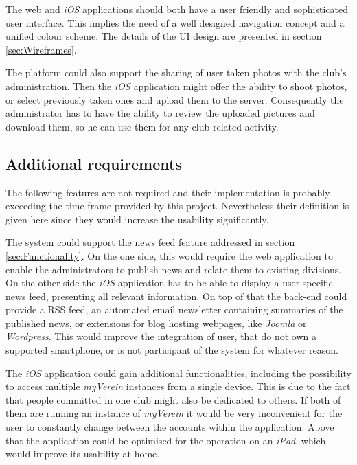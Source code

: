 The web and \emph{iOS} applications should both have a user friendly and sophisticated user interface. This implies the need of a well designed navigation concept and a unified colour scheme. The details of the \gls{UI} design are presented in section \vref{sec:Wireframes}. 

The platform could also support the sharing of user taken photos with the club's administration. Then the \emph{iOS} application might offer the ability to shoot photos, or select previously taken ones and upload them to the server. Consequently the administrator has to have the ability to review the uploaded pictures and download them, so he can use them for any club related activity.

\subsection{Additional requirements}
\label{sec:AdditionalReq}

The following features are not required and their implementation is probably exceeding the time frame provided by this project. Nevertheless their definition is given here since they would increase the usability significantly. 

The system could support the news feed feature addressed in section \vref{sec:Functionality}. On the one side, this would require the web application to enable the administrators to publish news and relate them to existing divisions. On the other side the \emph{iOS} application has to be able to display a user specific news feed, presenting all relevant information. On top of that the back-end could provide a \gls{RSS} feed, an automated email newsletter containing summaries of the published news, or extensions for blog hosting webpages, like \emph{Joomla} or \emph{Wordpress}. This would improve the integration of user, that do not own a supported smartphone, or is not participant of the system for whatever reason.

The \emph{iOS} application could gain additional functionalities, including the possibility to access multiple \emph{myVerein} instances from a single device. This is due to the fact that people committed in one club might also be dedicated to others. If both of them are running an instance of \emph{myVerein} it would be very inconvenient for the user to constantly change between the accounts within the application. Above that the application could be optimised for the operation on an \emph{iPad}, which would improve its usability at home.

